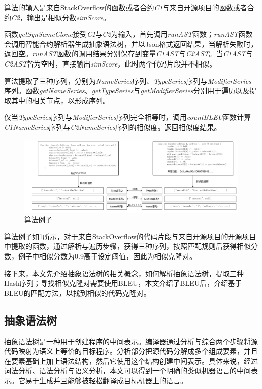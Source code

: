 算法的输入是来自StackOverflow的函数或者合约\textit{C1}与来自开源项目的函数或者合约\textit{C2}，输出是相似分数\textit{simScore}。

函数\textit{getSynSameClone}接受\textit{C1}与\textit{C2}为输入，首先调用\textit{runAST}函数；\textit{runAST}函数会调用智能合约解析器生成抽象语法树，并以Json格式返回结果，当解析失败时，返回空。\textit{runAST}函数的调用结果分别保存到变量\textit{C1AST}与\textit{C2AST}。当\textit{C1AST}与\textit{C2AST}皆为空时，直接输出\textit{simScore}，此时两个代码片段并不相似。

算法提取了三种序列，分别为\textit{NameSeries}序列、\textit{TypeSeries}序列与\textit{ModifierSeries}序列。函数\textit{getNameSeries}、\textit{getTypeSeries}与\textit{getModifierSeries}分别用于遍历以及提取其中的相关节点，以形成序列。

仅当\textit{TypeSeries}序列与\textit{ModifierSeries}序列完全相等时，调用\textit{countBLEU}函数计算\textit{C1NameSeries}序列与\textit{C2NameSeries}序列的相似度。返回相似度结果。

\begin{figure}[htbp]
\centering
\includegraphics[width=1\textwidth]{figures/methodExample.png}
\caption{算法例子}
\label{methodExa}
\end{figure}

算法例子如\ref{methodExa}所示，对于来自StackOverflow的代码片段与来自开源项目的开源项目中提取的函数，通过解析与遍历步骤，获得三种序列，按照匹配规则后获得相似分数，例子中相似分数为0.9高于设定阈值，因此为相似克隆对。

接下来，本文先介绍抽象语法树的相关概念，如何解析抽象语法树，提取三种Hash序列；寻找相似克隆对需要使用BLEU，本文介绍了BLEU后，介绍基于BLEU的匹配方法，以找到相似的代码克隆对。

\subsection{\label{ast_intro}抽象语法树}

抽象语法树\cite{compilers}是一种用于创建程序的中间表示。编译器通过分析与综合两个步骤将源代码映射为语义上等价的目标程序。分析部分把源代码分解成多个组成要素，并且在要素基础上加上语法结构，然后它使用这个结构创建中间表示。具体来说，经过词法分析、语法分析与语义分析，本文可以得到一个明确的类似机器语言的中间表示。它易于生成并且能够被轻松翻译成目标机器上的语言。


